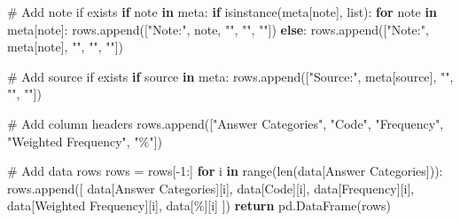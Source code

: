 \documentclass[
  11pt,
  a4paper,
]{article}
\newenvironment{Shaded}{\begin{snugshade}}{\end{snugshade}}
\newcommand{\BuiltInTok}[1]{\textcolor[rgb]{0.00,0.23,0.31}{#1}}
\newcommand{\CommentTok}[1]{\textcolor[rgb]{0.37,0.37,0.37}{#1}}
\newcommand{\ControlFlowTok}[1]{\textcolor[rgb]{0.00,0.23,0.31}{\textbf{#1}}}
\newcommand{\DecValTok}[1]{\textcolor[rgb]{0.68,0.00,0.00}{#1}}
\newcommand{\KeywordTok}[1]{\textcolor[rgb]{0.00,0.23,0.31}{\textbf{#1}}}
\newcommand{\NormalTok}[1]{\textcolor[rgb]{0.00,0.23,0.31}{#1}}
\newcommand{\OperatorTok}[1]{\textcolor[rgb]{0.37,0.37,0.37}{#1}}
\newcommand{\StringTok}[1]{\textcolor[rgb]{0.13,0.47,0.30}{#1}}
\begin{document}
\begin{Shaded}
\begin{Highlighting}[]
        \CommentTok{\# Add note if exists}
        \ControlFlowTok{if} \StringTok{\textquotesingle{}note\textquotesingle{}} \KeywordTok{in}\NormalTok{ meta:}
            \ControlFlowTok{if} \BuiltInTok{isinstance}\NormalTok{(meta[}\StringTok{\textquotesingle{}note\textquotesingle{}}\NormalTok{], }\BuiltInTok{list}\NormalTok{):}
                \ControlFlowTok{for}\NormalTok{ note }\KeywordTok{in}\NormalTok{ meta[}\StringTok{\textquotesingle{}note\textquotesingle{}}\NormalTok{]:}
\NormalTok{                    rows.append([}\StringTok{"Note:"}\NormalTok{, note, }\StringTok{""}\NormalTok{, }\StringTok{""}\NormalTok{, }\StringTok{""}\NormalTok{])}
            \ControlFlowTok{else}\NormalTok{:}
\NormalTok{                rows.append([}\StringTok{"Note:"}\NormalTok{, meta[}\StringTok{\textquotesingle{}note\textquotesingle{}}\NormalTok{], }\StringTok{""}\NormalTok{, }\StringTok{""}\NormalTok{, }\StringTok{""}\NormalTok{])}
        
        \CommentTok{\# Add source if exists}
        \ControlFlowTok{if} \StringTok{\textquotesingle{}source\textquotesingle{}} \KeywordTok{in}\NormalTok{ meta:}
\NormalTok{            rows.append([}\StringTok{"Source:"}\NormalTok{, meta[}\StringTok{\textquotesingle{}source\textquotesingle{}}\NormalTok{], }\StringTok{""}\NormalTok{, }\StringTok{""}\NormalTok{, }\StringTok{""}\NormalTok{])}
        
        \CommentTok{\# Add column headers}
\NormalTok{        rows.append([}\StringTok{"Answer Categories"}\NormalTok{, }\StringTok{"Code"}\NormalTok{, }\StringTok{"Frequency"}\NormalTok{, }\StringTok{"Weighted Frequency"}\NormalTok{, }\StringTok{"\%"}\NormalTok{])}
        
        \CommentTok{\# Add data rows}
\NormalTok{        rows }\OperatorTok{=}\NormalTok{ rows[}\OperatorTok{{-}}\DecValTok{1}\NormalTok{:]}
        \ControlFlowTok{for}\NormalTok{ i }\KeywordTok{in} \BuiltInTok{range}\NormalTok{(}\BuiltInTok{len}\NormalTok{(data[}\StringTok{\textquotesingle{}Answer Categories\textquotesingle{}}\NormalTok{])):}
\NormalTok{            rows.append([}
\NormalTok{                data[}\StringTok{\textquotesingle{}Answer Categories\textquotesingle{}}\NormalTok{][i],}
\NormalTok{                data[}\StringTok{\textquotesingle{}Code\textquotesingle{}}\NormalTok{][i],}
\NormalTok{                data[}\StringTok{\textquotesingle{}Frequency\textquotesingle{}}\NormalTok{][i],}
\NormalTok{                data[}\StringTok{\textquotesingle{}Weighted Frequency\textquotesingle{}}\NormalTok{][i],}
\NormalTok{                data[}\StringTok{\textquotesingle{}\%\textquotesingle{}}\NormalTok{][i]}
\NormalTok{            ])}
        \ControlFlowTok{return}\NormalTok{ pd.DataFrame(rows)}
    

\end{Highlighting}
\end{Shaded}
\end{document}
